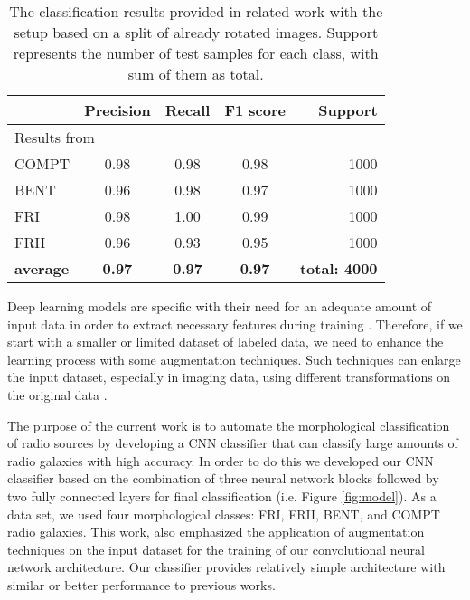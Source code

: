 \documentclass[fleqn,usenatbib]{mnras}
\begin{document}
\begin{table}
\centering
\caption{The classification results provided in related work with the setup based on a split of already rotated images. Support represents the number of test samples for each class, with sum of them as total.}
\label{table_sota2}
\begin{tabular}{lcccr}
\hline
                 & \textbf{Precision} & \textbf{Recall} & \textbf{F1 score} &  \textbf{Support}\\ \hline
\multicolumn{5}{l}{Results from \cite{2}}                                                       \\ \hline
COMPT            & 0.98              & 0.98                & 0.98              & 1000           \\ 
BENT             & 0.96              & 0.98                & 0.97              & 1000           \\ 
FRI              & 0.98              & 1.00                & 0.99              & 1000           \\ 
FRII             & 0.96              & 0.93                & 0.95              & 1000           \\ \hline
\textbf{average}  & \textbf{0.97}     & \textbf{0.97}       & \textbf{0.97}             & \textbf{total: 4000}       \\
\hline
\end{tabular}
\end{table}


Deep learning models are specific with their need for an adequate amount of input data in order to extract necessary features during training \citep{Goodfellow-et-al-2016}. Therefore, if we start with a smaller or limited dataset of labeled data, we need to enhance the learning process with some augmentation techniques. Such techniques can enlarge the input dataset, especially in imaging data, using different transformations on the original data \citep{shorten2019survey}. 

The purpose of the current work is to automate the morphological classification of radio sources by developing a CNN classifier that can classify large amounts of radio galaxies with high accuracy. In order to do this we developed  our CNN classifier based on the combination of three neural network blocks  followed by two fully connected layers for final classification (i.e. Figure \ref{fig:model}). As a data set, we used  four morphological classes: FRI, FRII, BENT, and COMPT radio galaxies. This work, also emphasized the application of augmentation techniques on the input dataset for the training of our convolutional neural network architecture. Our classifier provides relatively simple architecture with similar or better performance to previous works.
\end{document}
